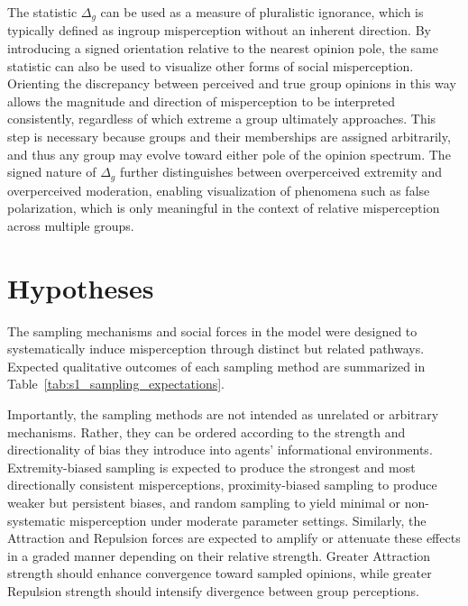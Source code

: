 The statistic $\Delta_g$ can be used as a measure of pluralistic ignorance, which is typically defined as ingroup misperception without an inherent direction. By introducing a signed orientation relative to the nearest opinion pole, the same statistic can also be used to visualize other forms of social misperception. Orienting the discrepancy between perceived and true group opinions in this way allows the magnitude and direction of misperception to be interpreted consistently, regardless of which extreme a group ultimately approaches. This step is necessary because groups and their memberships are assigned arbitrarily, and thus any group may evolve toward either pole of the opinion spectrum. The signed nature of $\Delta_g$ further distinguishes between overperceived extremity and overperceived moderation, enabling visualization of phenomena such as false polarization, which is only meaningful in the context of relative misperception across multiple groups.


\section{Hypotheses}


The sampling mechanisms and social forces in the model were designed to systematically induce misperception through distinct but related pathways. Expected qualitative outcomes of each sampling method are summarized in Table~\ref{tab:s1_sampling_expectations}.

Importantly, the sampling methods are not intended as unrelated or arbitrary mechanisms. Rather, they can be ordered according to the strength and directionality of bias they introduce into agents' informational environments. Extremity-biased sampling is expected to produce the strongest and most directionally consistent misperceptions, proximity-biased sampling to produce weaker but persistent biases, and random sampling to yield minimal or non-systematic misperception under moderate parameter settings. Similarly, the Attraction and Repulsion forces are expected to amplify or attenuate these effects in a graded manner depending on their relative strength. Greater Attraction strength should enhance convergence toward sampled opinions, while greater Repulsion strength should intensify divergence between group perceptions.

